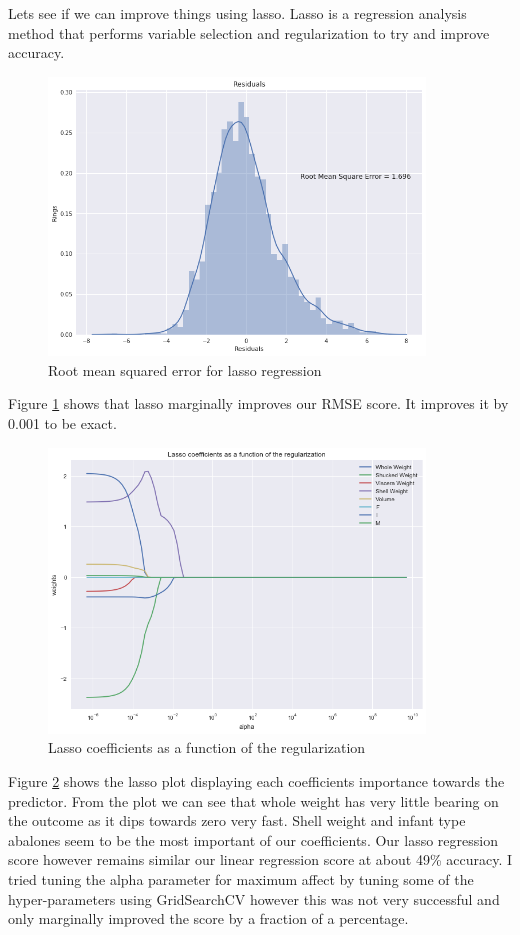 Lets see if we can improve things using lasso. Lasso is a regression analysis method that performs variable selection and regularization to try and improve accuracy.
\begin{figure}[H]
  \centering
  \includegraphics[scale=0.5,width=100mm]{./images/abalone-lasso-regression.png}
  \caption{Root mean squared error for lasso regression}
  \label{fig:abalone-lasso-regression}
\end{figure}
Figure \ref{fig:abalone-lasso-regression} shows that lasso marginally improves our RMSE score. It improves it by 0.001 to be exact. 
\begin{figure}[H]
  \centering
  \includegraphics[scale=0.5,width=100mm]{./images/abalone-lasso-plot.png}
  \caption{Lasso coefficients as a function of the regularization}
  \label{fig:abalone-lasso-plot}
\end{figure}
Figure \ref{fig:abalone-lasso-plot} shows the lasso plot displaying each coefficients importance towards the predictor. From the plot we can see that whole weight has very little bearing on the outcome as it dips towards zero very fast. Shell weight and infant type abalones seem to be the most important of our coefficients. Our lasso regression score however remains similar our linear regression score at about 49\% accuracy. I tried tuning the alpha parameter for maximum affect by tuning some of the hyper-parameters using GridSearchCV however this was not very successful and only marginally improved the score by a fraction of a percentage.

